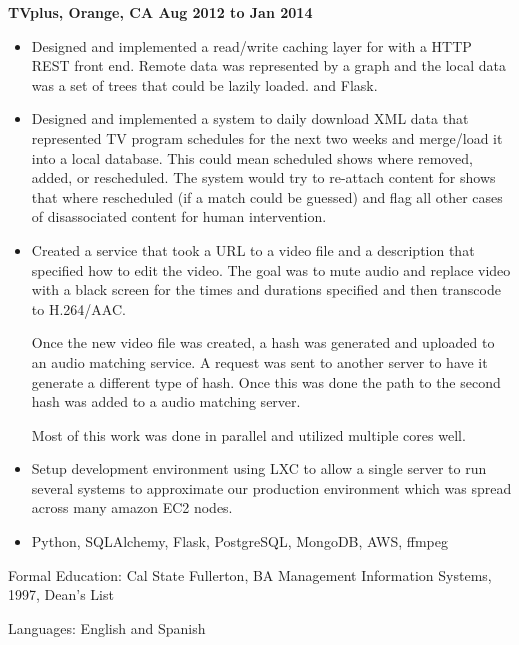 \documentclass{res}
\begin{document}
\begin{resume}
\begin{itemize}
  \end{itemize}

  {\large \bf TVplus, Orange, CA \hfill Aug 2012 to Jan 2014}

  \begin{itemize}

  \item
    Designed and implemented a read/write caching layer for with a
    HTTP REST front end.
    Remote data was represented by a graph and the
    local data was a set of trees that could be lazily loaded. 
    and Flask.

  \item
    Designed and implemented a system to daily download XML data
    that represented TV program schedules for the next two weeks and
    merge/load it into a local database.  This could mean scheduled
    shows where removed, added, or rescheduled.  The system would try
    to re-attach content for shows that where rescheduled (if a match
    could be guessed) and flag all other cases of disassociated content
    for human intervention.

  \item
    Created a service that took a URL to a video file and a description
    that specified how to edit the video.  The goal was to mute audio
    and replace video with a black screen for the times and durations
    specified and then transcode to H.264/AAC.

    Once the new video file was created, a hash was generated and uploaded
    to an audio matching service. A request was sent to another server
    to have it generate a different type of hash.  Once this was done
    the path to the second hash was added to a audio matching server.

    Most of this work was done in parallel and utilized multiple cores
    well.

  \item
    Setup development environment using LXC to allow a single server to
    run several systems to approximate our production environment which
    was spread across many amazon EC2 nodes.

  \item
    Python, SQLAlchemy, Flask, PostgreSQL, MongoDB, AWS, ffmpeg

  \end{itemize}

  Formal Education: Cal State Fullerton, BA Management Information
  Systems, 1997, Dean's List

  Languages: English and Spanish

\end{resume}
\end{document}
